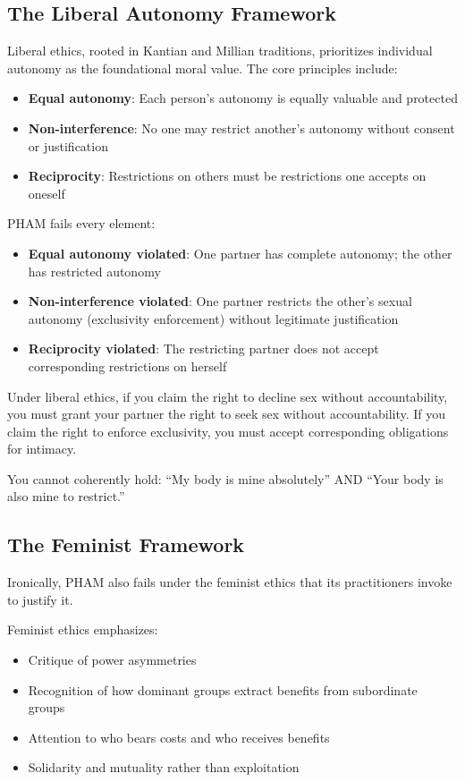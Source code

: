 \documentclass[12pt,openany]{book}
\numberwithin{equation}{chapter}
\begin{document}
\subsection{The Liberal Autonomy Framework}

Liberal ethics, rooted in Kantian and Millian traditions, prioritizes individual autonomy as the foundational moral value. The core principles include:

\begin{itemize}
    \item \textbf{Equal autonomy}: Each person's autonomy is equally valuable and protected
    \item \textbf{Non-interference}: No one may restrict another's autonomy without consent or justification
    \item \textbf{Reciprocity}: Restrictions on others must be restrictions one accepts on oneself
\end{itemize}

PHAM fails every element:

\begin{itemize}
    \item \textbf{Equal autonomy violated}: One partner has complete autonomy; the other has restricted autonomy
    \item \textbf{Non-interference violated}: One partner restricts the other's sexual autonomy (exclusivity enforcement) without legitimate justification
    \item \textbf{Reciprocity violated}: The restricting partner does not accept corresponding restrictions on herself
\end{itemize}

Under liberal ethics, if you claim the right to decline sex without accountability, you must grant your partner the right to seek sex without accountability. If you claim the right to enforce exclusivity, you must accept corresponding obligations for intimacy.

You cannot coherently hold: ``My body is mine absolutely'' AND ``Your body is also mine to restrict.''

\subsection{The Feminist Framework}

Ironically, PHAM also fails under the feminist ethics that its practitioners invoke to justify it.

Feminist ethics emphasizes:
\begin{itemize}
    \item Critique of power asymmetries
    \item Recognition of how dominant groups extract benefits from subordinate groups
    \item Attention to who bears costs and who receives benefits
    \item Solidarity and mutuality rather than exploitation
\end{itemize}
\end{document}
